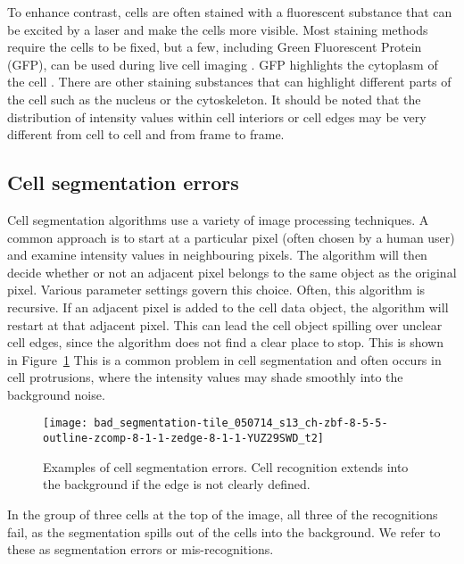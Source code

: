 To enhance contrast, cells are often stained with a fluorescent substance that can be excited by a laser and make the cells more visible. Most staining methods require the cells to be fixed, but a few, including Green Fluorescent Protein (GFP), can be used during live cell imaging . GFP highlights the cytoplasm of the cell . There are other staining substances that can highlight different parts of the cell such as the nucleus or the cytoskeleton. It should be noted that the distribution of intensity values within cell interiors or cell edges may be very different from cell to cell and from frame to frame.

\subsection{Cell segmentation errors}

Cell segmentation algorithms use a variety of image processing techniques. A common approach is to start at a particular pixel (often chosen by a human user) and examine intensity values in neighbouring pixels. The algorithm will then decide whether or not an adjacent pixel belongs to the same object as the original pixel. Various parameter settings govern this choice. Often, this algorithm is recursive. If an adjacent pixel is added to the cell data object, the algorithm will restart at that adjacent pixel. This can lead the cell object spilling over unclear cell edges, since the algorithm does not find a clear place to stop. This is shown in Figure~\ref{fig:cell_segmentation_errors} This is a common problem in cell segmentation and often occurs in cell protrusions, where the intensity values may shade smoothly into the background noise.

\begin{figure}[htbp!]
\centering
\texttt{[image: bad\_segmentation-tile\_050714\_s13\_ch-zbf-8-5-5-outline-zcomp-8-1-1-zedge-8-1-1-YUZ29SWD\_t2]}
\caption[Cell segmentation error examples]{Examples of cell segmentation errors. Cell recognition extends into the background if the edge is not clearly defined.}
\label{fig:cell_segmentation_errors}
\end{figure}

In the group of three cells at the top of the image, all three of the recognitions fail, as the segmentation spills out of the cells into the background. We refer to these as segmentation errors or mis-recognitions.

